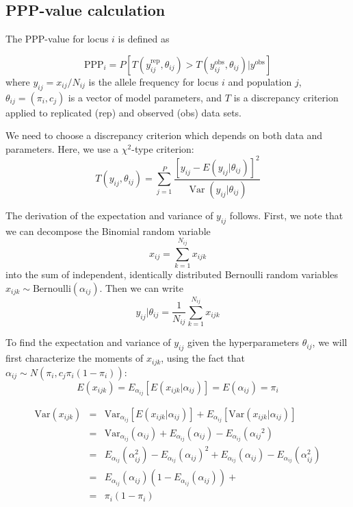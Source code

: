 \documentclass[a4paper,12pt]{article}
\begin{document}
\subsection{PPP-value calculation}

The PPP-value for locus $i$ is defined as

$$\text{PPP}_i = 
P\left[T(y_{ij}^{\text{rep}},\theta_{ij})>
       T(y_{ij}^{\text{obs}},\theta_{ij})|y^{\text{obs}}\right]
$$
where $y_{ij}=x_{ij}/N_{ij}$ is the allele frequency for locus $i$ and
population $j$, $\theta_{ij}=(\pi_i,c_j)$ is a vector of model
parameters, and $T$ is a discrepancy criterion applied to replicated
(rep) and observed (obs) data sets.

We need to choose a discrepancy criterion which depends on both data
and parameters. Here, we use a $\chi^2$-type criterion:
$$T(y_{ij},\theta_{ij}) = \sum_{j=1}^P 
\frac{\left[y_{ij} - E(y_{ij}|\theta_{ij})\right]^2}{
  \operatorname{Var}(y_{ij}|\theta_{ij})}
$$

The derivation of the expectation and variance of $y_{ij}$
follows. First, we note that we can decompose the Binomial random
variable
$$
x_{ij}=\sum_{k=1}^{N_{ij}} x_{ijk}
$$
into the sum of independent, identically distributed Bernoulli random
variables $x_{ijk}\sim \text{Bernoulli}(\alpha_{ij})$. Then we can write
$$
y_{ij}|\theta_{ij} = \frac 1 {N_{ij}} \sum_{k=1}^{N_{ij}} x_{ijk}
$$

To find the expectation and variance of $y_{ij}$ given the
hyperparameters $\theta_{ij}$, we will first characterize the moments
of $x_{ijk}$, using the fact that $\alpha_{ij}\sim
N(\pi_i,c_j\pi_i(1-\pi_i))$: \newcommand{\eaij}{E_{{\alpha_{ij}}}}
\newcommand{\vaij}{\Var_{{\alpha_{ij}}}}
$$
E(x_{ijk}) = \eaij \left[ E(x_{ijk}|{\alpha_{ij}})\right] = E({\alpha_{ij}}) = \pi_i
$$

\newcommand{\Var}{\text{Var}}
\newcommand{\Cov}{\text{Cov}}
\begin{eqnarray*}
  \text{Var}(x_{ijk}) &=&
  \Var_{\alpha_{ij}} \left[ E(x_{ijk}|\alpha_{ij}) \right] +
  E_{\alpha_{ij}} \left[ \Var(x_{ijk}|\alpha_{ij}) \right] \\
  &=& 
  \vaij(\alpha_{ij}) + \eaij({\alpha_{ij}})-\eaij({\alpha_{ij}}^2)
  \\
  &=&
  \eaij(\alpha_{ij}^2)-\eaij(\alpha_{ij})^2+
  \eaij(\alpha_{ij})-\eaij(\alpha_{ij}^2)\\
  &=&
  \eaij(\alpha_{ij})\left(1-\eaij(\alpha_{ij})\right)+
  \\
  &=&\pi_i(1-\pi_i)
\end{eqnarray*}
\end{document}
